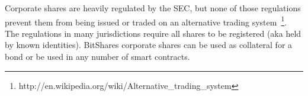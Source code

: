 Corporate shares are heavily regulated by the SEC, but none of those
regulations prevent them from being issued or traded on an alternative trading
system~\footnote{http://en.wikipedia.org/wiki/Alternative\_trading\_system}.
The regulations in many jurisdictions require all shares to be registered (aka
held by known identities). BitShares corporate shares can be used as
collateral for a bond or be used in any number of smart contracts.
